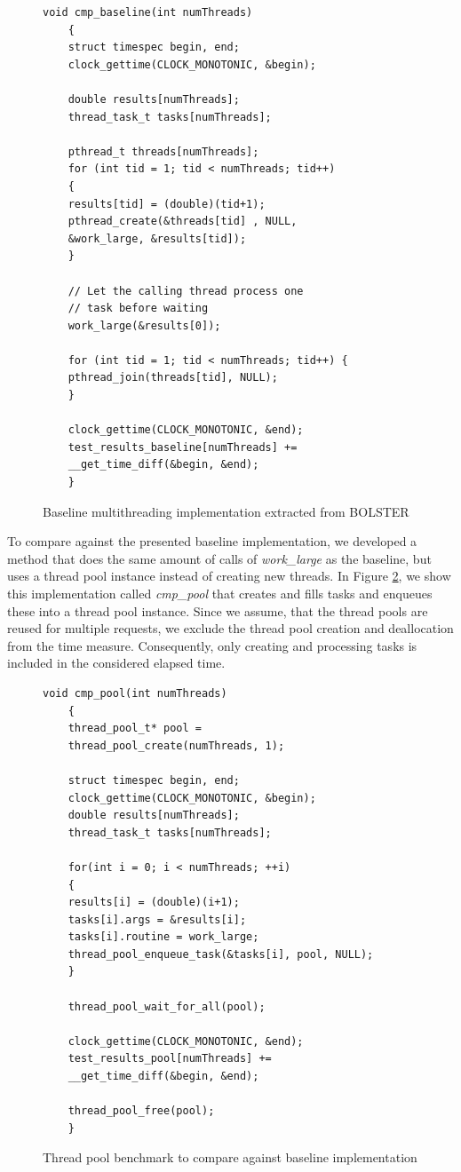\documentclass[conference]{IEEEtran}
\begin{document}
\begin{figure}
	\begin{lstlisting}[style=CStyle]
	void cmp_baseline(int numThreads)
	{
	struct timespec begin, end;
	clock_gettime(CLOCK_MONOTONIC, &begin);
	
	double results[numThreads];
	thread_task_t tasks[numThreads];
	
	pthread_t threads[numThreads];
	for (int tid = 1; tid < numThreads; tid++)
	{
	results[tid] = (double)(tid+1);
	pthread_create(&threads[tid] , NULL, 
	&work_large, &results[tid]);
	}
	
	// Let the calling thread process one 
	// task before waiting
	work_large(&results[0]);
	
	for (int tid = 1; tid < numThreads; tid++) {
	pthread_join(threads[tid], NULL);
	}
	
	clock_gettime(CLOCK_MONOTONIC, &end);
	test_results_baseline[numThreads] +=
	__get_time_diff(&begin, &end);
	}
	\end{lstlisting}
	\caption{Baseline multithreading implementation extracted from BOLSTER}
	\label{fig4}
\end{figure}

To compare against the presented baseline implementation, we developed a method that does the same amount of calls of \emph{work\_large} as the baseline, but uses a thread pool instance instead of creating new threads. In Figure \ref{fig5}, we show this implementation called \emph{cmp\_pool} that creates and fills tasks and enqueues these into a thread pool instance. Since we assume, that the thread pools are reused for multiple requests, we exclude the thread pool creation and deallocation from the time measure. Consequently, only creating and processing tasks is included in the considered elapsed time. 

\begin{figure}
	\begin{lstlisting}[style=CStyle]
	void cmp_pool(int numThreads)
	{
	thread_pool_t* pool = 
	thread_pool_create(numThreads, 1);
	
	struct timespec begin, end;
	clock_gettime(CLOCK_MONOTONIC, &begin);
	double results[numThreads];
	thread_task_t tasks[numThreads];
	
	for(int i = 0; i < numThreads; ++i)
	{
	results[i] = (double)(i+1);
	tasks[i].args = &results[i];
	tasks[i].routine = work_large;
	thread_pool_enqueue_task(&tasks[i], pool, NULL);
	}
	
	thread_pool_wait_for_all(pool);
	
	clock_gettime(CLOCK_MONOTONIC, &end);
	test_results_pool[numThreads] += 
	__get_time_diff(&begin, &end);
	
	thread_pool_free(pool);
	}
	\end{lstlisting}
	\caption{Thread pool benchmark to compare against baseline implementation}
	\label{fig5}
\end{figure}
\end{document}
